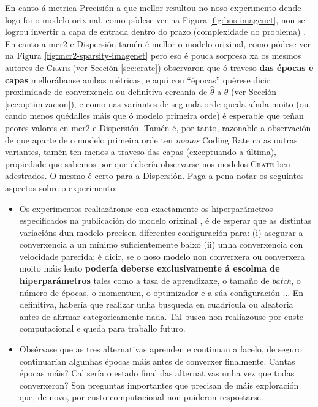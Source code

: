 En canto á metrica Precisión a que mellor resultou no noso experimento dende logo foi o modelo orixinal, como pódese ver na Figura \ref{fig:bus-imagenet}, non se logrou invertir a capa de entrada dentro do prazo (complexidade do problema) . En canto a \acrshort{mcr2} e Dispersión tamén é mellor o modelo orixinal, como pódese ver na Figura \ref{fig:mcr2-sparsity-imagenet} pero eso é pouca sorpresa xa os mesmos autores de \textsc{Crate} (ver Sección \ref{sec:crate}) observaron que ó traveso \textbf{das épocas e capas} mellorábanse ambas métricas, e aquí con ``épocas'' quérese dicir proximidade de converxencia ou definitiva cercanía de $\hat\theta$ a $\theta$ \cite{vapnik95} (ver Sección \ref{sec:optimizacion}), e como nas variantes de segunda orde queda aínda moito (ou cando menos quédalles máis que ó modelo primeira orde) é esperable que teñan peores valores en \acrshort{mcr2} e Dispersión. Tamén é, por tanto, razonable a observación de que aparte de o modelo primeira orde ten \emph{menos} Coding Rate ca as outras variantes, tamén ten menos a traveso das capas (exceptuando a última), propiedade que sabemos por \cite{crate} que debería observarse nos modelos \textsc{Crate} ben adestrados. O mesmo é certo para a Dispersión. Paga a pena notar os seguintes aspectos sobre o experimento:
\begin{itemize}
				\item Os experimentos realiazáronse con exactamente os hiperparámetros especificados na publicación do modelo orixinal \cite{crate}, é de esperar que as distintas variacións dun modelo precisen diferentes configuración para: (i) asegurar a converxencia a un mínimo suficientemente baixo (ii) unha converxencia con velocidade parecida; é dicir, se o noso modelo non converxera ou converxera moito máis lento \textbf{podería deberse exclusivamente á escolma de hiperparámetros} tales como a \gls{tasa de aprendizaxe}, o tamaño de \emph{batch}, o número de épocas, o momentum, o optimizador e a súa configuración $\dots$ En definitiva, habería que realizar unha busqueda en cuadrícula ou aleatoria \cite{randomsearch} antes de afirmar categoricamente nada. Tal busca non realiazouse por custe computacional e queda para traballo futuro.
				\item Obsérvase que as tres alternativas aprenden e continuan a facelo, de seguro continuarían algunhas épocas máis antes de converxer finalmente. Cantas épocas máis? Cal sería o estado final das alternativas unha vez que todas converxeron? Son preguntas importantes que precisan de máis exploración que, de novo, por custo computacional non puideron respostarse.
\end{itemize}

